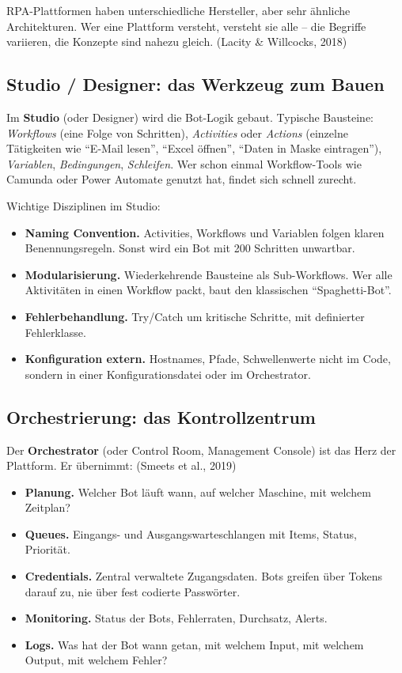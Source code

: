 \documentclass[11pt,a4paper,oneside]{article}
\newcommand{\fachbegriff}[1]{\textbf{#1}}
\newcommand{\quelle}[1]{{\footnotesize\color{lpGray}(#1)}}
\begin{document}
RPA-Plattformen haben unterschiedliche Hersteller, aber sehr ähnliche Architekturen. Wer eine Plattform versteht, versteht sie alle -- die Begriffe variieren, die Konzepte sind nahezu gleich. \quelle{Lacity \& Willcocks, 2018}

\subsection{Studio / Designer: das Werkzeug zum Bauen}

Im \fachbegriff{Studio} (oder Designer) wird die Bot-Logik gebaut. Typische Bausteine: \emph{Workflows} (eine Folge von Schritten), \emph{Activities} oder \emph{Actions} (einzelne Tätigkeiten wie ``E-Mail lesen'', ``Excel öffnen'', ``Daten in Maske eintragen''), \emph{Variablen}, \emph{Bedingungen}, \emph{Schleifen}. Wer schon einmal Workflow-Tools wie Camunda oder Power Automate genutzt hat, findet sich schnell zurecht.

Wichtige Disziplinen im Studio:

\begin{itemize}
  \item \fachbegriff{Naming Convention.} Activities, Workflows und Variablen folgen klaren Benennungsregeln. Sonst wird ein Bot mit 200 Schritten unwartbar.
  \item \fachbegriff{Modularisierung.} Wiederkehrende Bausteine als Sub-Workflows. Wer alle Aktivitäten in einen Workflow packt, baut den klassischen ``Spaghetti-Bot''.
  \item \fachbegriff{Fehlerbehandlung.} Try/Catch um kritische Schritte, mit definierter Fehlerklasse.
  \item \fachbegriff{Konfiguration extern.} Hostnames, Pfade, Schwellenwerte nicht im Code, sondern in einer Konfigurationsdatei oder im Orchestrator.
\end{itemize}

\subsection{Orchestrierung: das Kontrollzentrum}

Der \fachbegriff{Orchestrator} (oder Control Room, Management Console) ist das Herz der Plattform. Er übernimmt: \quelle{Smeets et al., 2019}

\begin{itemize}
  \item \fachbegriff{Planung.} Welcher Bot läuft wann, auf welcher Maschine, mit welchem Zeitplan?
  \item \fachbegriff{Queues.} Eingangs- und Ausgangswarteschlangen mit Items, Status, Priorität.
  \item \fachbegriff{Credentials.} Zentral verwaltete Zugangsdaten. Bots greifen über Tokens darauf zu, nie über fest codierte Passwörter.
  \item \fachbegriff{Monitoring.} Status der Bots, Fehlerraten, Durchsatz, Alerts.
  \item \fachbegriff{Logs.} Was hat der Bot wann getan, mit welchem Input, mit welchem Output, mit welchem Fehler?
\end{itemize}
\end{document}
